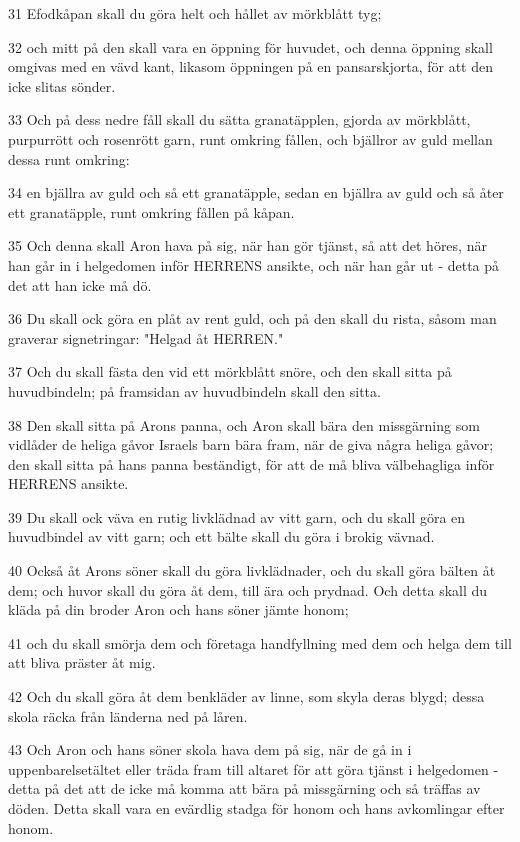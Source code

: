 \par 31 Efodkåpan skall du göra helt och hållet av mörkblått tyg;
\par 32 och mitt på den skall vara en öppning för huvudet, och denna öppning skall omgivas med en vävd kant, likasom öppningen på en pansarskjorta, för att den icke slitas sönder.
\par 33 Och på dess nedre fåll skall du sätta granatäpplen, gjorda av mörkblått, purpurrött och rosenrött garn, runt omkring fållen, och bjällror av guld mellan dessa runt omkring:
\par 34 en bjällra av guld och så ett granatäpple, sedan en bjällra av guld och så åter ett granatäpple, runt omkring fållen på kåpan.
\par 35 Och denna skall Aron hava på sig, när han gör tjänst, så att det höres, när han går in i helgedomen inför HERRENS ansikte, och när han går ut - detta på det att han icke må dö.
\par 36 Du skall ock göra en plåt av rent guld, och på den skall du rista, såsom man graverar signetringar: "Helgad åt HERREN."
\par 37 Och du skall fästa den vid ett mörkblått snöre, och den skall sitta på huvudbindeln; på framsidan av huvudbindeln skall den sitta.
\par 38 Den skall sitta på Arons panna, och Aron skall bära den missgärning som vidlåder de heliga gåvor Israels barn bära fram, när de giva några heliga gåvor; den skall sitta på hans panna beständigt, för att de må bliva välbehagliga inför HERRENS ansikte.
\par 39 Du skall ock väva en rutig livklädnad av vitt garn, och du skall göra en huvudbindel av vitt garn; och ett bälte skall du göra i brokig vävnad.
\par 40 Också åt Arons söner skall du göra livklädnader, och du skall göra bälten åt dem; och huvor skall du göra åt dem, till ära och prydnad. Och detta skall du kläda på din broder Aron och hans söner jämte honom;
\par 41 och du skall smörja dem och företaga handfyllning med dem och helga dem till att bliva präster åt mig.
\par 42 Och du skall göra åt dem benkläder av linne, som skyla deras blygd; dessa skola räcka från länderna ned på låren.
\par 43 Och Aron och hans söner skola hava dem på sig, när de gå in i uppenbarelsetältet eller träda fram till altaret för att göra tjänst i helgedomen - detta på det att de icke må komma att bära på missgärning och så träffas av döden. Detta skall vara en evärdlig stadga för honom och hans avkomlingar efter honom.

